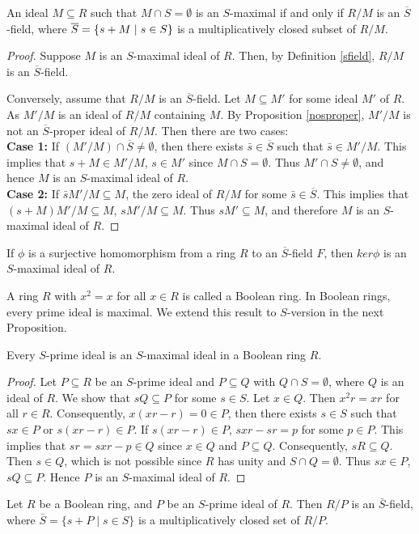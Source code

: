 \documentclass[11pt]{article}
\begin{document}
	\begin{prop}\label{mfield}
		
		An ideal $M\subseteq R$ such that $M\cap S=\emptyset$ is an $S$-maximal if and only if $R/M$ is an $\overline{S}$-field, where $\overline{S}=\{s+M\hspace{0.1cm}|\hspace{0.1cm}s\in S\}$ is a multiplicatively closed subset of $R/M$. 
	\end{prop}
	\begin{proof}
		Suppose $M$ is an $S$-maximal ideal of $R$. Then, by Definition \ref{sfield}, $R/M$ is an $\overline{S}$-field. 
		
		Conversely, assume that $R/M$ is an $\overline{S}$-field. Let $M\subseteq M'$ for some ideal $M'$ of $R$. As $M'/M$ is an ideal of $R/M$ containing $M$. By Proposition \ref{nosproper}, $M'/M$ is not an $\overline{S}$-proper ideal of $R/M$. Then there are two cases:\\
		\textbf{Case 1:} If $(M'/M)\cap \overline{S}\neq\emptyset$, then there exists $\bar{s}\in\overline{S}$ such that $\bar{s}\in M'/M$. This implies that $s+M\in M'/M$, $s\in M'$ since $M\cap S=\emptyset$. Thus $ M'\cap S\neq\emptyset$, and hence $M$ is an $S$-maximal ideal of $R$.\\
		\textbf{Case 2:} If $\bar{s}M'/M\subseteq M$, the zero ideal of $R/M$ for some $\bar{s}\in\overline{S}$. This implies that $(s+M) M'/M\subseteq M$, $sM'/M\subseteq M$. Thus $ sM'\subseteq M$, and therefore $M$ is an $S$-maximal ideal of $R$.	
	\end{proof}
	\begin{cor}
		If $\phi$ is a surjective homomorphism from a ring $R$ to an $\overline{S}$-field $F$, then $ker\phi$ is an $S$-maximal ideal of $R$.
	\end{cor}
	A ring $R$ with $x^2=x$ for all $x\in R$ is called a Boolean ring. In Boolean rings, every prime ideal is maximal. We extend this result to $S$-version in the next Proposition.
	\begin{prop}
		Every $S$-prime ideal is an $S$-maximal ideal in a Boolean ring $R$.
	\end{prop}
	\begin{proof}
		Let $P\subseteq R$ be an $S$-prime ideal and $P\subseteq Q$ with $Q\cap S=\emptyset$, where $Q$ is an ideal of $R$. We show that $sQ\subseteq P$ for some $s\in S$. Let $x\in Q$. Then $x^{2}r=xr$ for all $r\in R$. Consequently, $x(xr-r)=0\in P$, then there exists $s\in S$ such that $sx\in P$ or $s(xr-r)\in P$. If $s(xr-r)\in P$, $sxr-sr=p$ for some $p\in P$. This implies that $sr=sxr-p\in Q$ since $x\in Q$ and $P\subseteq Q$. Consequently, $sR\subseteq Q$. Then $s\in Q$, which is not possible since $R$ has unity and $S\cap Q=\emptyset$. Thus $sx\in P$, $sQ\subseteq P$. Hence $P$ is an $S$-maximal ideal of $R$.
	\end{proof}
	\begin{cor}
		Let $R$ be a Boolean ring, and $P$ be an $S$-prime ideal of $R$. Then $R/P$ is an $\bar{S}$-field, where $\bar{S}=\{s+P\mid s\in S\}$ is a multiplicatively closed set of $R/P$.
	\end{cor}
	
\end{document}
